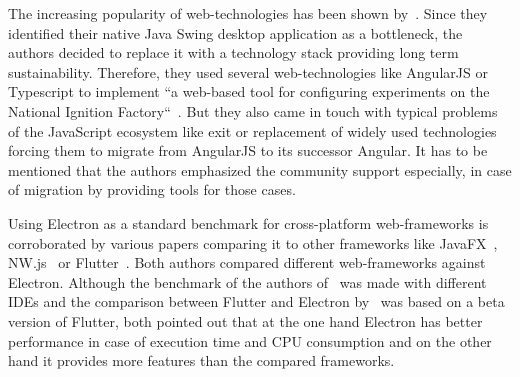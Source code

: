 The increasing popularity of web-technologies has been shown by~\cite{pernice:icalepcs2019-wempr006}.
Since they identified their native Java Swing desktop application as a bottleneck, the authors decided to replace it with a technology stack providing long term sustainability.
Therefore, they used several web-technologies like AngularJS or Typescript to implement ``a web-based tool for configuring experiments on the National Ignition Factory``~\cite{pernice:icalepcs2019-wempr006}.
But they also came in touch with typical problems of the JavaScript ecosystem like exit or replacement of widely used technologies forcing them to migrate from
AngularJS to its successor Angular.
It has to be mentioned that the authors emphasized the community support especially, in case of migration by providing tools for those cases.

Using Electron as a standard benchmark for cross-platform web-frameworks is corroborated by various papers comparing it to other frameworks like JavaFX~\cite{electron-javafx}, NW.js~\cite{electron-nwjs} or Flutter~\cite{flutter}.
Both authors compared different web-frameworks against Electron.
Although the benchmark of the authors of~\cite{electron-javafx} was made with different \ac{IDE}s and the comparison between Flutter and Electron by~\cite{flutter} was based on a beta version of Flutter,
both pointed out that at the one hand Electron has better performance in case of execution time and CPU consumption and on the other hand it provides more features than the compared frameworks.

